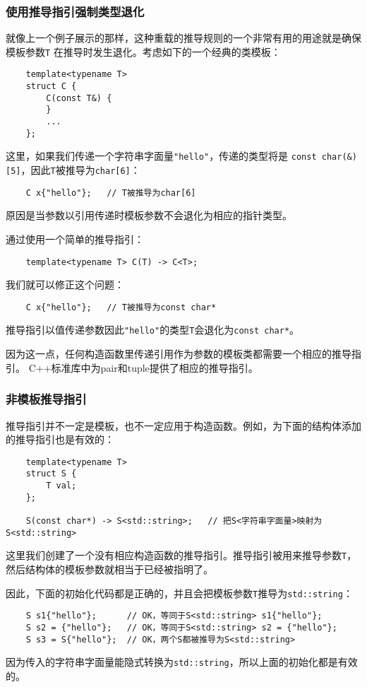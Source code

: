 \subsubsection{使用推导指引强制类型退化}\label{ch9.2.1}
就像上一个例子展示的那样，这种重载的推导规则的一个非常有用的用途就是确保模板参数\texttt{T}
在推导时发生退化。考虑如下的一个经典的类模板：
\begin{lstlisting}
    template<typename T>
    struct C {
        C(const T&) {
        }
        ...
    };
\end{lstlisting}
这里，如果我们传递一个字符串字面量\texttt{"hello"}，传递的类型将是
\texttt{const char(\&)[5]}，因此\texttt{T}被推导为\texttt{char[6]}：
\begin{lstlisting}
    C x{"hello"};   // T被推导为char[6]
\end{lstlisting}
原因是当参数以引用传递时模板参数不会退化为相应的指针类型。

通过使用一个简单的推导指引：
\begin{lstlisting}
    template<typename T> C(T) -> C<T>;
\end{lstlisting}
我们就可以修正这个问题：
\begin{lstlisting}
    C x{"hello"};   // T被推导为const char*
\end{lstlisting}
推导指引以值传递参数因此\texttt{"hello"}的类型\texttt{T}会退化为\texttt{const char*}。

因为这一点，任何构造函数里传递引用作为参数的模板类都需要一个相应的推导指引。
C++标准库中为pair和tuple提供了相应的推导指引。

\subsubsection{非模板推导指引}
推导指引并不一定是模板，也不一定应用于构造函数。例如，为下面的结构体添加的推导指引也是有效的：
\begin{lstlisting}
    template<typename T>
    struct S {
        T val;
    };

    S(const char*) -> S<std::string>;   // 把S<字符串字面量>映射为S<std::string>
\end{lstlisting}
这里我们创建了一个没有相应构造函数的推导指引。推导指引被用来推导参数\texttt{T}，
然后结构体的模板参数就相当于已经被指明了。

因此，下面的初始化代码都是正确的，并且会把模板参数\texttt{T}推导为\texttt{std::string}：
\begin{lstlisting}
    S s1{"hello"};      // OK，等同于S<std::string> s1{"hello"};
    S s2 = {"hello"};   // OK，等同于S<std::string> s2 = {"hello"};
    S s3 = S{"hello"};  // OK，两个S都被推导为S<std::string>
\end{lstlisting}
因为传入的字符串字面量能隐式转换为\texttt{std::string}，所以上面的初始化都是有效的。

